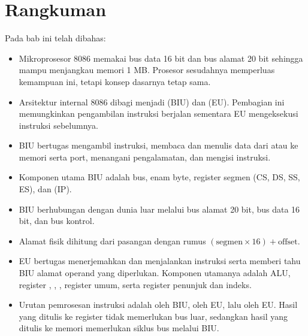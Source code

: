 \section{Rangkuman}
\label{sec:rangkuman-bab4}

Pada bab ini telah dibahas:

\begin{itemize}
    \item Mikroprosesor 8086 memakai bus data 16 bit dan bus alamat
          20 bit sehingga mampu menjangkau memori 1 MB. Prosesor
          sesudahnya memperluas kemampuan ini, tetapi konsep dasarnya
          tetap sama.

    \item Arsitektur internal 8086 dibagi menjadi  (BIU) dan  (EU). Pembagian ini
          memungkinkan pengambilan instruksi berjalan sementara EU
          mengeksekusi instruksi sebelumnya.

    \item BIU bertugas mengambil instruksi, membaca dan menulis data
          dari atau ke memori serta port, menangani pengalamatan, dan
          mengisi  instruksi.

    \item Komponen utama BIU adalah bus,  enam byte,
          register segmen (CS, DS, SS, ES), dan  (IP).

    \item BIU berhubungan dengan dunia luar melalui bus alamat
          20 bit, bus data 16 bit, dan bus kontrol.

    \item Alamat fisik dihitung dari pasangan 
          dengan rumus $(\text{segmen} \times 16) + \text{offset}$.

    \item EU bertugas menerjemahkan dan menjalankan instruksi serta
          memberi tahu BIU alamat operand yang diperlukan. Komponen
          utamanya adalah ALU, register , ,
          , register umum, serta
          register penunjuk dan indeks.

    \item Urutan pemrosesan instruksi adalah  oleh BIU,
           oleh EU, lalu  oleh EU. Hasil yang
          ditulis ke register tidak memerlukan bus luar, sedangkan
          hasil yang ditulis ke memori memerlukan siklus bus melalui
          BIU.
\end{itemize}


